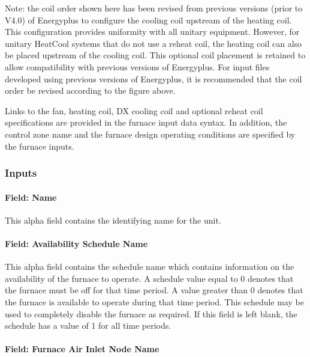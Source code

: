Note: the coil order shown here has been revised from previous versions (prior to V4.0) of Energyplus to configure the cooling coil upstream of the heating coil. This configuration provides uniformity with all unitary equipment. However, for unitary HeatCool systems that do not use a reheat coil, the heating coil can also be placed upstream of the cooling coil. This optional coil placement is retained to allow compatibility with previous versions of Energyplus. For input files developed using previous versions of Energyplus, it is recommended that the coil order be revised according to the figure above.

Links to the fan, heating coil, DX cooling coil and optional reheat coil specifications are provided in the furnace input data syntax. In addition, the control zone name and the furnace design operating conditions are specified by the furnace inputs.

\subsubsection{Inputs}\label{inputs-2-043}

\paragraph{Field: Name}\label{field-name-2-040}

This alpha field contains the identifying name for the unit.

\paragraph{Field: Availability Schedule Name}\label{field-availability-schedule-name-1-012}

This alpha field contains the schedule name which contains information on the availability of the furnace to operate. A schedule value equal to 0 denotes that the furnace must be off for that time period. A value greater than 0 denotes that the furnace is available to operate during that time period. This schedule may be used to completely disable the furnace as required. If this field is left blank, the schedule has a value of 1 for all time periods.

\paragraph{Field: Furnace Air Inlet Node Name}\label{field-furnace-air-inlet-node-name}

